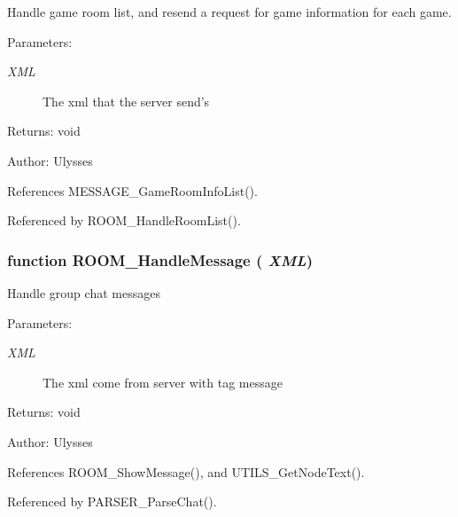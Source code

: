 Handle game room list, and resend a request for game information for each game.

\begin{Desc}
\item[Parameters:]
\begin{description}
\item[{\em XML}]The xml that the server send's \end{description}
\end{Desc}
\begin{Desc}
\item[Returns:]void \end{Desc}
\begin{Desc}
\item[Author:]Ulysses \end{Desc}


References MESSAGE\_\-GameRoomInfoList().

Referenced by ROOM\_\-HandleRoomList().
\subsubsection{\setlength{\rightskip}{0pt plus 5cm}function ROOM\_\-HandleMessage ( {\em XML})}\label{room_2room_8js_b8e44c24ddafeaba9d1828af2e1ac279}


Handle group chat messages

\begin{Desc}
\item[Parameters:]
\begin{description}
\item[{\em XML}]The xml come from server with tag message \end{description}
\end{Desc}
\begin{Desc}
\item[Returns:]void \end{Desc}
\begin{Desc}
\item[Author:]Ulysses \end{Desc}


References ROOM\_\-ShowMessage(), and UTILS\_\-GetNodeText().

Referenced by PARSER\_\-ParseChat().
